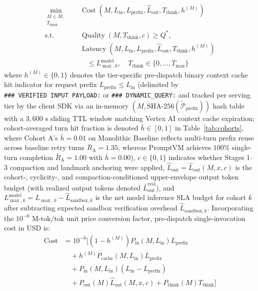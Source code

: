 \documentclass[conference,10pt]{IEEEtran}
\begin{document}
\begin{equation}
\label{eq:pareto_opt}
\begin{aligned}
\min_{\substack{M \in \mathcal{M},\\ T_{\text{think}}}} \quad & \operatorname{Cost}\!\left(M, L_{\text{in}}, L_{\text{prefix}}, \hat{L}_{\text{out}}, T_{\text{think}}, h^{(M)}\right) \\
\text{s.t.} \quad & \operatorname{Quality}(M, T_{\text{think}}, c) \ge Q^*, \\
& \operatorname{Latency}\!\left(M, L_{\text{in}}, L_{\text{prefix}}, \hat{L}_{\text{out}}, T_{\text{think}}, h^{(M)}\right) \\
&\quad \le L_{\max,k}^{\text{model}}, \quad T_{\text{think}} \in \{0,\dots,T_{\max}\}
\end{aligned}
\end{equation}
where $h^{(M)} \in \{0, 1\}$ denotes the tier-specific pre-dispatch binary context cache hit indicator for request prefix $L_{\text{prefix}} \le L_{\text{in}}$ (delimited by \texttt{\#\#\#\allowbreak\ VERIFIED\allowbreak\ INPUT\allowbreak\ PAYLOAD:} or \texttt{\#\#\#\allowbreak\ DYNAMIC\_\allowbreak QUERY:} and tracked per serving tier by the client SDK via an in-memory $(M, \text{SHA-256}(\tilde{\mathcal{P}}_{\text{prefix}}))$ hash table with a $3{,}600\text{ s}$ sliding TTL window matching Vertex AI context cache expiration; cohort-averaged turn hit fraction is denoted $\bar{h} \in [0, 1]$ in Table~\ref{tab:cohorts}, where Cohort A's $\bar{h}=0.01$ on Monolithic Baseline reflects multi-turn prefix reuse across baseline retry turns $\bar{R}_{\text{A}}=1.35$, whereas PromptVM achieves $100\%$ single-turn completion $\bar{R}_{\text{A}}=1.00$ with $\bar{h}=0.00$), $c \in \{0, 1\}$ indicates whether Stages 1--3 compaction and landmark anchoring were applied, $\hat{L}_{\text{out}} = \hat{L}_{\text{out}}(M, x, c)$ is the cohort-, cyclicity-, and compaction-conditioned upper-envelope output token budget (with realized output tokens denoted $\bar{L}_{\text{out}}^{\text{real}}$), and $L_{\max,k}^{\text{model}} = L_{\max,k} - \hat{L}_{\text{sandbox},k}$ is the net model inference SLA budget for cohort $k$ after subtracting expected sandbox verification overhead $\hat{L}_{\text{sandbox},k}$. Incorporating the $10^{-6}\text{ M-tok/tok}$ unit price conversion factor, pre-dispatch single-invocation cost in USD is:
\begin{equation}
\label{eq:cost_formula}
\begin{split}
\operatorname{Cost} &= 10^{-6} \Big[ (1 - h^{(M)}) P_{\text{in}}(M, L_{\text{in}}) L_{\text{prefix}} \\
&\quad + h^{(M)} P_{\text{cache}}(M, L_{\text{in}}) L_{\text{prefix}} \\
&\quad + P_{\text{in}}(M, L_{\text{in}})(L_{\text{in}} - L_{\text{prefix}}) \\
&\quad + P_{\text{out}}(M) \hat{L}_{\text{out}}(M, x, c) + P_{\text{think}}(M) T_{\text{think}} \Big]
\end{split}
\end{equation}
\end{document}
